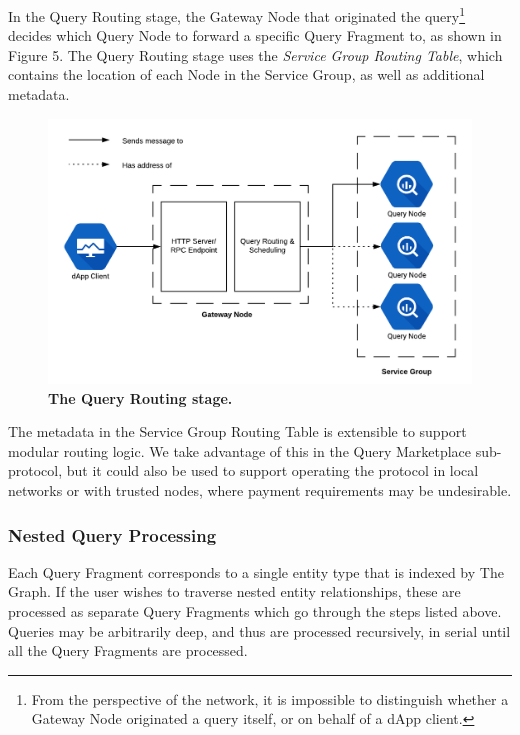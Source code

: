 \documentclass[12pt]{article}
\begin{document}
In the Query Routing stage, the Gateway Node that originated the
query\footnote{From the perspective of the network, it is impossible to
  distinguish whether a Gateway Node originated a query itself, or on behalf of
  a dApp client.} decides which Query Node to forward a specific Query Fragment
to, as shown in Figure 5. The Query Routing stage uses the \textit{Service Group
  Routing Table}, which contains the location of each Node in the Service Group,
as well as additional metadata.

\begin{figure}[H]
  \caption{\textbf{The Query Routing stage.}}
  \begin{center}
    \includegraphics[width=.9\textwidth]{media/image9.png}
  \end{center}
\end{figure}

The metadata in the Service Group Routing Table is extensible to support modular
routing logic. We take advantage of this in the Query Marketplace sub-protocol,
but it could also be used to support operating the protocol in local networks or
with trusted nodes, where payment requirements may be undesirable.

\subsubsection*{Nested Query Processing}

Each Query Fragment corresponds to a single entity type that is indexed by The
Graph. If the user wishes to traverse nested entity relationships, these are
processed as separate Query Fragments which go through the steps listed above.
Queries may be arbitrarily deep, and thus are processed recursively, in serial
until all the Query Fragments are processed.
\end{document}
